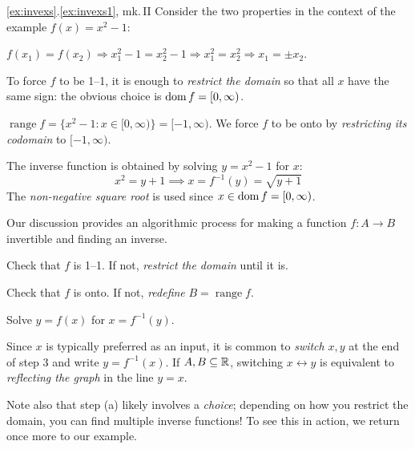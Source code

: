 
\begin{example*}{\ref*{ex:invexs}.\ref{ex:invexs1}, mk.\,II}{}
	Consider the two properties in the context of the example $f(x)=x^2-1$:
	\begin{enumeratea}
		\item $f(x_1)=f(x_2)\Longrightarrow x_1^2-1=x_2^2-1\Longrightarrow x_1^2=x_2^2\Longrightarrow x_1=\pm x_2$.\par
		To force $f$ to be 1--1, it is enough to \emph{restrict the domain} so that all $x$ have the same sign: the obvious choice is $\operatorname{dom} f=[0,\infty)$.
		\item $\operatorname{range} f=\bigl\{x^2-1:x\in[0,\infty)\bigr\}=[-1,\infty)$. We force $f$ to be onto by \emph{restricting its codomain} to $[-1,\infty)$.
	\end{enumeratea}
	The inverse function is obtained by solving $y=x^2-1$ for $x$:
	\[
		x^2=y+1\implies x=f^{-1}(y)=\sqrt{y+1}
	\]
	The \emph{non-negative square root} is used since $x\in\operatorname{dom} f=[0,\infty)$.
\end{example*}
\goodbreak



Our discussion provides an algorithmic process for making a function $f:A\to B$ invertible and finding an inverse.
\begin{enumeratea}\itemsep2pt
	\item Check that $f$ is 1--1. If not, \emph{restrict the domain} until it is.
	\item Check that $f$ is onto. If not, \emph{redefine} $B=\operatorname{range} f$.
	\item Solve $y=f(x)$ for $x=f^{-1}(y)$.
\end{enumeratea}

Since $x$ is typically preferred as an input, it is common to \emph{switch} $x,y$ at the end of step 3 and write $y=f^{-1}(x)$. If $A,B\subseteq\mathbb{R}$, switching $x\leftrightarrow y$ is equivalent to \emph{reflecting the graph} in the line $y=x$.\smallbreak

Note also that step (a) likely involves a \emph{choice}; depending on how you restrict the domain, you can find multiple inverse functions! To see this in action, we return once more to our example.

